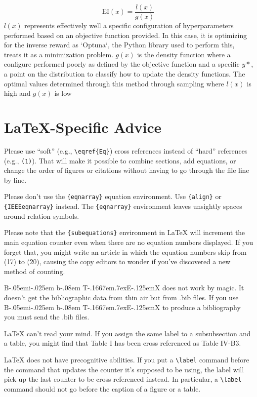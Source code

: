 \documentclass[conference]{IEEEtran}
\def\BibTeX{{\rm B\kern-.05em{\sc i\kern-.025em b}\kern-.08em
    T\kern-.1667em\lower.7ex\hbox{E}\kern-.125emX}}
\begin{document}
\[
\text{EI}(x) = \frac{l(x)}{g(x)}
\]
$l(x)$ represents effectively well a specific configuration of hyperparameters performed based on an objective function provided. In this case, it is optimizing for the inverse reward  as `Optuna`, the Python library used to perform this, treats it as a minimization problem. $g(x)$ is the density function where a configure performed poorly as defined by the objective function and a specific $y*$, a point on the distribution to classify how to update the density functions. The optimal values determined through this method through sampling where $l(x)$ is high and $g(x)$ is low

\section{\LaTeX-Specific Advice}

Please use ``soft'' (e.g., \verb|\eqref{Eq}|) cross references instead
of ``hard'' references (e.g., \verb|(1)|). That will make it possible
to combine sections, add equations, or change the order of figures or
citations without having to go through the file line by line.

Please don't use the \verb|{eqnarray}| equation environment. Use
\verb|{align}| or \verb|{IEEEeqnarray}| instead. The \verb|{eqnarray}|
environment leaves unsightly spaces around relation symbols.

Please note that the \verb|{subequations}| environment in {\LaTeX}
will increment the main equation counter even when there are no
equation numbers displayed. If you forget that, you might write an
article in which the equation numbers skip from (17) to (20), causing
the copy editors to wonder if you've discovered a new method of
counting.

{\BibTeX} does not work by magic. It doesn't get the bibliographic
data from thin air but from .bib files. If you use {\BibTeX} to produce a
bibliography you must send the .bib files. 

{\LaTeX} can't read your mind. If you assign the same label to a
subsubsection and a table, you might find that Table I has been cross
referenced as Table IV-B3. 

{\LaTeX} does not have precognitive abilities. If you put a
\verb|\label| command before the command that updates the counter it's
supposed to be using, the label will pick up the last counter to be
cross referenced instead. In particular, a \verb|\label| command
should not go before the caption of a figure or a table.
\end{document}

